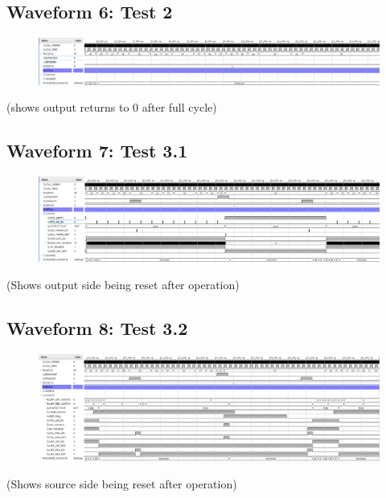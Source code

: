 \documentclass[11pt]{report}
\begin{document}
\subsection*{Waveform 6: Test 2 }
\begin{figure}[H]
       \includegraphics[width=\columnwidth]{Assets/Test2.png}
\end{figure}

(shows output returns to 0 after full cycle)

\subsection*{Waveform 7: Test 3.1 }
\begin{figure}[H]
       \includegraphics[width=\columnwidth]{Assets/Test3_1.png}
\end{figure}

(Shows output side being reset after operation)

\subsection*{Waveform 8: Test 3.2 }
\begin{figure}[H]
       \includegraphics[width=\columnwidth]{Assets/Test3_2.png}
\end{figure}

(Shows source side being reset after operation)
\end{document}
